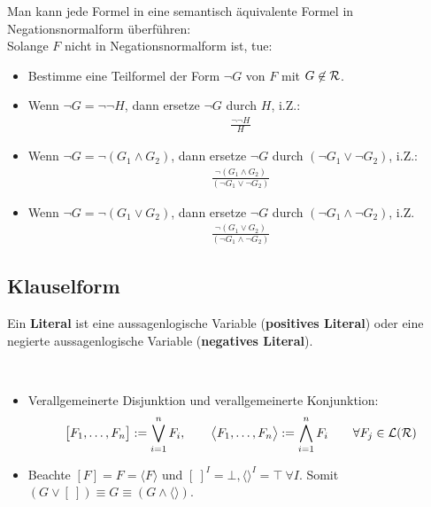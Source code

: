 \begin{proposition}\label{prop3.25}
	Man kann jede Formel in eine semantisch äquivalente Formel in Negationsnormalform überführen:\\
	Solange $F$ nicht in Negationsnormalform ist, tue:
	\begin{itemize}
		\item Bestimme eine Teilformel der Form $\neg G$ von $F$ mit $G\not\in\mathcal{R}$.
		\item Wenn $\neg G=\neg\neg H$, dann ersetze $\neg G$ durch $H$, i.Z.:
		\begin{align*}
			\frac{\neg\neg H}{H}
		\end{align*}
		\item Wenn $\neg G=\neg(G_1\wedge G_2)$, dann ersetze $\neg G$ durch $(\neg G_1\vee\neg G_2)$, i.Z.:
		\begin{align*}
			\frac{\neg(G_1\wedge G_2)}{(\neg G_1\vee\neg G_2)}
		\end{align*}
		\item Wenn $\neg G=\neg(G_1\vee G_2)$, dann ersetze $\neg G$ durch $(\neg G_1\wedge\neg G_2)$, i.Z.
		\begin{align*}
			\frac{\neg(G_1\vee G_2)}{(\neg G_1\wedge\neg G_2)}
		\end{align*}
	\end{itemize}
\end{proposition}

\subsection{Klauselform}

\begin{definition}\label{def3.26}
	Ein \textbf{Literal} ist eine aussagenlogische Variable (\textbf{positives Literal}) oder eine negierte aussagenlogische Variable (\textbf{negatives Literal}).
\end{definition}

\begin{notation}\
	\begin{itemize}
		\item Verallgemeinerte Disjunktion und verallgemeinerte Konjunktion:
		\begin{align*}
			\big[F_1,\ldots,F_n\big]:=\bigvee\limits_{i=1}^n F_i,\qquad
			\big\langle F_1,\ldots,F_n\big\rangle:=\bigwedge\limits_{i=1}^n F_i
			\qquad\forall F_j\in\mathcal{L}(\mathcal{R})
		\end{align*}
		\item Beachte $[F]=F=\langle F\rangle$ und $[~]^I=\bot,\langle\rangle^I=\top~\forall I$.
		Somit $(G\vee[~])\equiv G\equiv(G\wedge\langle\rangle)$.
	\end{itemize}
\end{notation}

